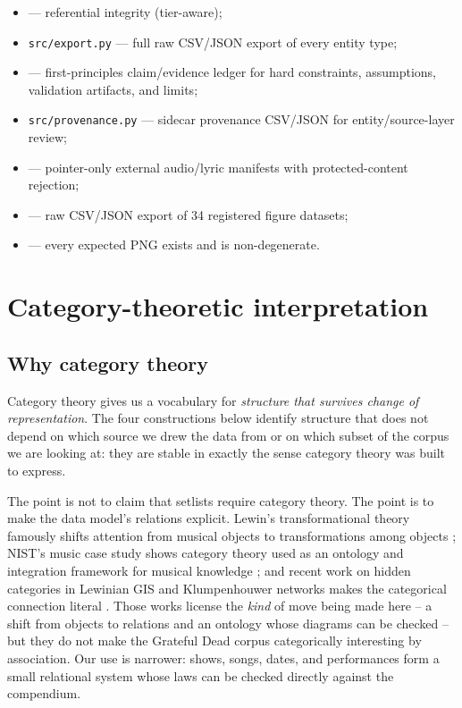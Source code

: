 \documentclass[
]{article}
\providecommand{\tightlist}{%
  \setlength{\itemsep}{0pt}\setlength{\parskip}{0pt}}
\begin{document}
\begin{itemize}
\tightlist
\item
   --- referential integrity
  (tier-aware);
\item
  \texttt{src/export.py} --- full raw CSV/JSON export of every entity
  type;
\item
   --- first-principles
  claim/evidence ledger for hard constraints, assumptions, validation
  artifacts, and limits;
\item
  \texttt{src/provenance.py} --- sidecar provenance CSV/JSON for
  entity/source-layer review;
\item
   --- pointer-only external
  audio/lyric manifests with protected-content rejection;
\item
   --- raw CSV/JSON export of 34 registered
  figure datasets;
\item
   --- every expected PNG
  exists and is non-degenerate.
\end{itemize}

\newpage

\section{Category-theoretic
interpretation}\label{category-theoretic-interpretation}

\subsection{Why category theory}\label{why-category-theory}

Category theory gives us a vocabulary for \emph{structure that survives
change of representation}. The four constructions below identify
structure that does not depend on which source we drew the data from or
on which subset of the corpus we are looking at: they are stable in
exactly the sense category theory was built to express.

The point is not to claim that setlists require category theory. The
point is to make the data model's relations explicit. Lewin's
transformational theory famously shifts attention from musical objects
to transformations among objects \citep{lewin_gmit}; NIST's music case
study shows category theory used as an ontology and integration
framework for musical knowledge \citep{padi_category_music_case_study};
and recent work on hidden categories in Lewinian GIS and Klumpenhouwer
networks makes the categorical connection literal
\citep{popoff_hidden_categories}. Those works license the \emph{kind} of
move being made here -- a shift from objects to relations and an
ontology whose diagrams can be checked -- but they do not make the
Grateful Dead corpus categorically interesting by association. Our use
is narrower: shows, songs, dates, and performances form a small
relational system whose laws can be checked directly against the
compendium.
\end{document}
